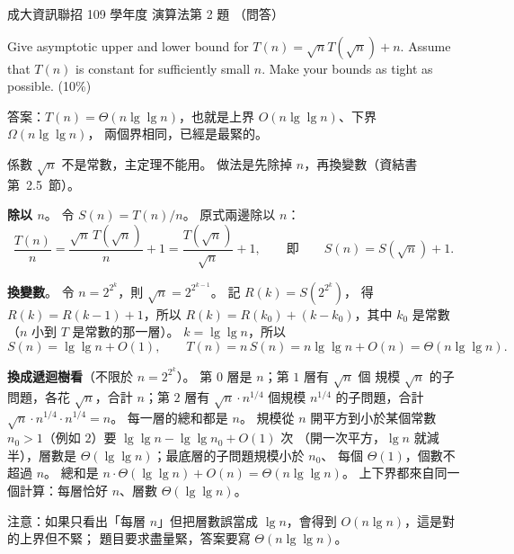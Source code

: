 \begin{pastexam}[label={px:ncku-109-prog-05}]{成大資訊聯招 109 學年度 演算法第 2 題}
（問答）

Give asymptotic upper and lower bound for $T(n)=\sqrt{n}T(\sqrt{n})+n$. Assume that $T(n)$ is
constant for sufficiently small $n$. Make your bounds as tight as possible. (10\%)
\end{pastexam}

\begin{pastsoln}
答案：$T(n) = \Theta(n \lg\lg n)$，也就是上界 $O(n \lg\lg n)$、下界 $\Omega(n \lg\lg n)$，
兩個界相同，已經是最緊的。

係數 $\sqrt{n}$ 不是常數，主定理不能用。 做法是先除掉 $n$，再換變數（資結書第~2.5~節）。

\textbf{除以 $n$}。 令 $S(n) = T(n)/n$。 原式兩邊除以 $n$：
\[
\frac{T(n)}{n} = \frac{\sqrt{n}\,T(\sqrt{n})}{n} + 1 = \frac{T(\sqrt{n})}{\sqrt{n}} + 1,
\qquad\text{即}\qquad S(n) = S(\sqrt{n}) + 1 .
\]

\textbf{換變數}。 令 $n = 2^{2^k}$，則 $\sqrt{n} = 2^{2^{k-1}}$。 記 $R(k) = S(2^{2^k})$，
得 $R(k) = R(k - 1) + 1$，所以 $R(k) = R(k_0) + (k - k_0)$，其中 $k_0$ 是常數（$n$ 小到
$T$ 是常數的那一層）。 $k = \lg\lg n$，所以
\[
S(n) = \lg\lg n + O(1), \qquad T(n) = n\,S(n) = n \lg\lg n + O(n) = \Theta(n \lg\lg n).
\]

\textbf{換成遞迴樹看}（不限於 $n = 2^{2^k}$）。 第 $0$ 層是 $n$；第 $1$ 層有 $\sqrt{n}$ 個
規模 $\sqrt{n}$ 的子問題，各花 $\sqrt{n}$，合計 $n$；第 $2$ 層有 $\sqrt{n} \cdot n^{1/4}$ 個規模
$n^{1/4}$ 的子問題，合計 $\sqrt{n} \cdot n^{1/4} \cdot n^{1/4} = n$。 每一層的總和都是 $n$。
規模從 $n$ 開平方到小於某個常數 $n_0 > 1$（例如 $2$）要 $\lg\lg n - \lg\lg n_0 + O(1)$ 次
（開一次平方，$\lg n$ 就減半），層數是 $\Theta(\lg\lg n)$；最底層的子問題規模小於 $n_0$、
每個 $\Theta(1)$，個數不超過 $n$。 總和是 $n \cdot \Theta(\lg\lg n) + O(n) = \Theta(n \lg\lg n)$。
上下界都來自同一個計算：每層恰好 $n$、層數 $\Theta(\lg\lg n)$。

注意：如果只看出「每層 $n$」但把層數誤當成 $\lg n$，會得到 $O(n \lg n)$，這是對的上界但不緊；
題目要求盡量緊，答案要寫 $\Theta(n \lg\lg n)$。
\end{pastsoln}
